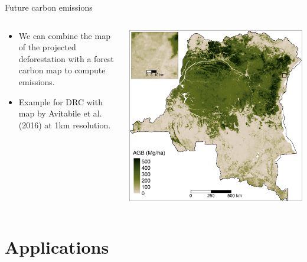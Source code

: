 \documentclass[10pt,table,dvipsnames,compress]{beamer}
\begin{document}
\begin{frame}[label={sec:org1b9cc07}]{Future carbon emissions}
\begin{columns}
\begin{column}{0.5\columnwidth}
\begin{itemize}
\item We can combine the map of the projected deforestation with a forest carbon map to compute emissions.
\item Example for DRC with map by Avitabile et al. (2016) at 1km resolution.
\end{itemize}
\end{column}

\begin{column}{0.5\columnwidth}
\includegraphics[width=\textwidth]{figs/sm/AGB}

\end{column}
\end{columns}
\end{frame}

\section{Applications}
\label{sec:orge02c9b1}
\end{document}
